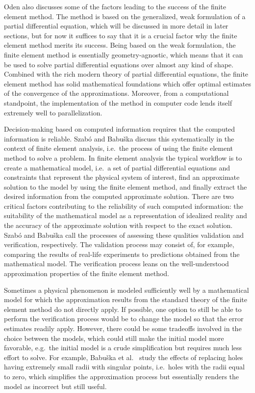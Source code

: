 \documentclass[english, 12pt, a4paper, sci, utf8, a-2b, online]{aaltothesis}
\theoremstyle{definition}
\theoremstyle{plain}
\numberwithin{equation}{section}
\begin{document}
Oden also discusses some of the factors leading to the success of the finite
element method. The method is based on the generalized, weak formulation of a
partial differential equation, which will be discussed in more
detail in later sections, but for now it suffices to say that it is a crucial
factor why the finite element method merits its success. Being based on the weak
formulation, the finite element method is essentially geometry-agnostic, which
means that it can be used to solve partial differential equations over almost any
kind of shape. Combined with the rich modern theory of partial differential
equations, the finite element method has solid mathematical foundations which offer
optimal estimates of the convergence of the approximations. 
Moreover, from a computational standpoint, the implementation of the method in 
computer code lends itself extremely well to parallelization.

Decision-making based on computed information requires that the computed
information is reliable. Szabó and Babu{\v s}ka \cite{szabobabuska2011}
discuss this systematically in the context of finite element analysis, i.e.\
the process of using the finite element method to solve a problem. In finite
element analysis the typical workflow is to create a mathematical model,
i.e.\ a set of partial differential equations and constraints
that represent the physical system of interest,
find an approximate solution to the model by using the finite element method,
and finally extract the desired information from the computed approximate solution.
There are two critical factors contributing to the reliability of such computed 
information: the suitability of the mathematical model as a representation of
idealized reality and the accuracy of the approximate solution with respect
to the exact solution.
Szabó and Babu{\v s}ka call the processes of assessing these qualities validation 
and verification, respectively.
The validation process may consist of, for example, comparing the results of
real-life experiments to predictions obtained from the mathematical model.
The verification process leans on the well-understood approximation
properties of the finite element method.

Sometimes a physical phenomenon is modeled sufficiently well by a 
mathematical model for which the approximation results from the standard
theory of the finite element method do not directly apply.
If possible, one option to still be able to perform the verification process would 
be to change the model so that the error estimates readily apply.
However, there could be some tradeoffs involved in the choice between the models,
which could still make the initial model more favorable,
e.g.\ the initial model is a crude simplification but requires much less
effort to solve. For example, Babu{\v s}ka et al.\ \cite{babuskasoanesuri2017}
study the effects of replacing holes having extremely small radii with singular
points, i.e.\ holes with the radii equal to zero,
which simplifies the approximation process
but essentially renders the model as incorrect but still useful.
\end{document}
